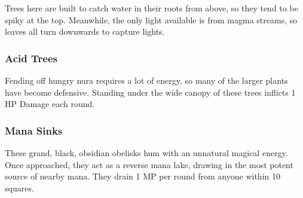 \begin{multicols}{2}
Trees here are built to catch water in their roots from above, so they tend to be spiky at the top.
Meanwhile, the only light available is from magma streams, so leaves all turn downwards to capture lights.

\subsubsection{Acid Trees}

Fending off hungry nura requires a lot of energy, so many of the larger plants have become defensive.
Standing under the wide canopy of these trees inflicts 1 HP Damage each round.

\subsubsection{Mana Sinks}

These grand, black, obsidian obelisks hum with an unnatural magical energy.
Once approached, they act as a reverse mana lake, drawing in the most potent source of nearby mana.
They drain 1 MP per round from anyone within 10 squares.

\end{multicols}
